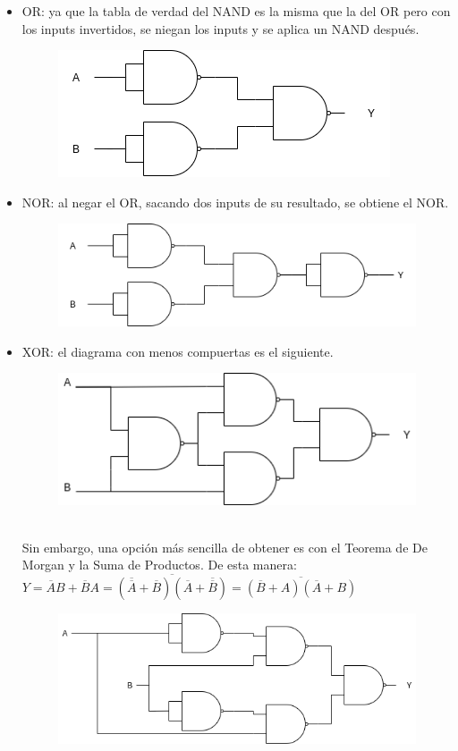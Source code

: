 \documentclass[11pt,a4paper]{article}
\begin{document}
\begin{enumerate}
\begin{itemize}
\item OR: ya que la tabla de verdad del NAND es la misma que la del OR pero con los inputs invertidos, se niegan los inputs y se aplica un NAND después.
\begin{figure}[h]
\centering
\includegraphics[scale=0.5]{4.png} 
\end{figure}
\item NOR: al negar el OR, sacando dos inputs de su resultado, se obtiene el NOR.
\begin{figure}[h!]
\centering
\includegraphics[scale=0.5]{5.png} 
\end{figure}
\item XOR: el diagrama con menos compuertas es el siguiente.
\begin{figure}[h!]
\centering
\includegraphics[scale=0.5]{6.png} 
\end{figure}
\\Sin embargo, una opción más sencilla de obtener es con el Teorema de De Morgan y la Suma de Productos. De esta manera:\\ $Y = \overline{A}B + \overline{B}A = \overline{(\overline{\overline{A}}+\overline{B})(\overline{A}+\overline{\overline{B}})} = \overline{(\overline{B}+A)(\overline{A}+B)}$
\begin{figure}[h!]
\centering
\includegraphics[scale=0.45]{7.png} 
\end{figure}

\end{itemize}
\end{enumerate}
\end{document}
